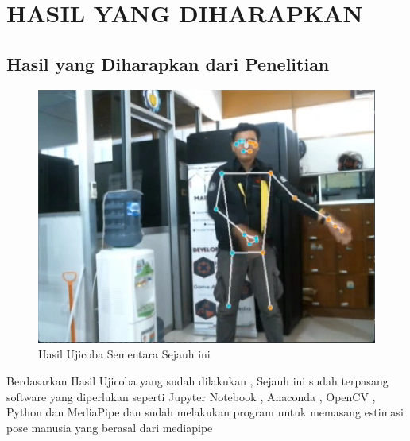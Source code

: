 \section{HASIL YANG DIHARAPKAN}

\subsection{Hasil yang Diharapkan dari Penelitian}

\begin{figure} [ht] \centering
    \includegraphics[scale=0.6]{gambar/contoh.png}
    \caption{Hasil Ujicoba Sementara Sejauh ini}
    \label{fig:Ujicoba Sementara}
  \end{figure}

Berdasarkan Hasil Ujicoba yang sudah dilakukan , Sejauh ini sudah terpasang software yang diperlukan seperti Jupyter Notebook , Anaconda , OpenCV , Python dan MediaPipe dan sudah melakukan program untuk memasang estimasi pose manusia yang berasal dari mediapipe
